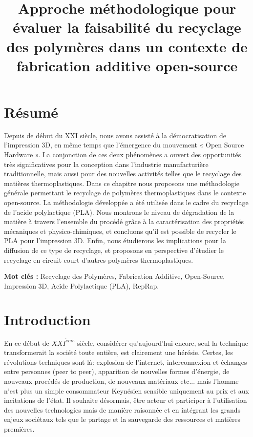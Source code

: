\documentclass[
]{article}
\title{Approche méthodologique pour évaluer la faisabilité du recyclage
des polymères dans un contexte de fabrication additive open-source}
\author{}
\date{\vspace{-2.5em}}
\begin{document}
\maketitle

\hypertarget{ruxe9sumuxe9}{%
\section*{Résumé}\label{ruxe9sumuxe9}}

Depuis de début du XXI siècle, nous avons assisté à la démocratisation
de l'impression 3D, en même temps que l'émergence du mouvement « Open
Source Hardware ». La conjonction de ces deux phénomènes a ouvert des
opportunités très significatives pour la conception dans l'industrie
manufacturière traditionnelle, mais aussi pour des nouvelles activités
telles que le recyclage des matières thermoplastiques. Dans ce chapitre
nous proposons une méthodologie générale permettant le recyclage de
polymères thermoplastiques dans le contexte open-source. La méthodologie
développée a été utilisée dans le cadre du recyclage de l'acide
polylactique (PLA). Nous montrons le niveau de dégradation de la matière
à travers l'ensemble du procédé grâce à la caractérisation des
propriétés mécaniques et physico-chimiques, et concluons qu'il est
possible de recycler le PLA pour l'impression 3D. Enfin, nous étudierons
les implications pour la diffusion de ce type de recyclage, et proposons
en perspective d'étudier le recyclage en circuit court d'autres
polymères thermoplastiques.

\textbf{Mot clés :} Recyclage des Polymères, Fabrication Additive,
Open-Source, Impression 3D, Acide Polylactique (PLA), RepRap.

\hypertarget{introduction}{%
\section{Introduction}\label{introduction}}

En ce début de \(XXI^{\grave{e}me}\) siècle, considérer qu'aujourd'hui
encore, seul la technique transformerait la société toute entière, est
clairement une hérésie. Certes, les révolutions techniques sont là:
explosion de l'internet, interconnexion et échanges entre personnes
(peer to peer), apparition de nouvelles formes d'énergie, de nouveaux
procédés de production, de nouveaux matériaux etc... mais l'homme n'est
plus un simple consommateur Keynésien sensible uniquement au prix et aux
incitations de l'état. Il souhaite désormais, être acteur et participer
à l'utilisation des nouvelles technologies mais de manière raisonnée et
en intégrant les grands enjeux sociétaux tels que le partage et la
sauvegarde des ressources et matières premières.
\end{document}
